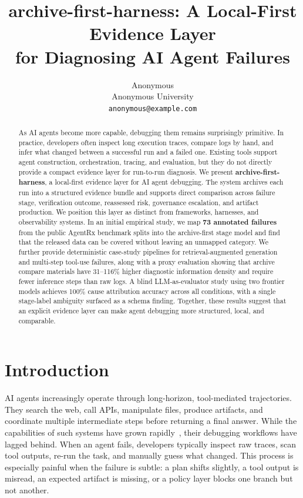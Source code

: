 \documentclass[11pt]{article}
\title{archive-first-harness: A Local-First Evidence Layer\\for Diagnosing AI Agent Failures}
\author{Anonymous \\ Anonymous University \\ \texttt{anonymous@example.com}}
\begin{document}
\maketitle

\begin{abstract}
As AI agents become more capable, debugging them remains surprisingly primitive. In practice, developers often inspect long execution traces, compare logs by hand, and infer what changed between a successful run and a failed one. Existing tools support agent construction, orchestration, tracing, and evaluation, but they do not directly provide a compact evidence layer for run-to-run diagnosis. We present \textbf{archive-first-harness}, a local-first evidence layer for AI agent debugging. The system archives each run into a structured evidence bundle and supports direct comparison across failure stage, verification outcome, reassessed risk, governance escalation, and artifact production. We position this layer as distinct from frameworks, harnesses, and observability systems. In an initial empirical study, we map \textbf{73 annotated failures} from the public AgentRx benchmark splits into the archive-first stage model and find that the released data can be covered without leaving an unmapped category. We further provide deterministic case-study pipelines for retrieval-augmented generation and multi-step tool-use failures, along with a proxy evaluation showing that archive compare materials have 31--116\% higher diagnostic information density and require fewer inference steps than raw logs. A blind LLM-as-evaluator study using two frontier models achieves 100\% cause attribution accuracy across all conditions, with a single stage-label ambiguity surfaced as a schema finding. Together, these results suggest that an explicit evidence layer can make agent debugging more structured, local, and comparable.
\end{abstract}

\section{Introduction}

AI agents increasingly operate through long-horizon, tool-mediated trajectories. They search the web, call APIs, manipulate files, produce artifacts, and coordinate multiple intermediate steps before returning a final answer. While the capabilities of such systems have grown rapidly~\cite{plaat2025agentic,guo2024llm}, their debugging workflows have lagged behind. When an agent fails, developers typically inspect raw traces, scan tool outputs, re-run the task, and manually guess what changed. This process is especially painful when the failure is subtle: a plan shifts slightly, a tool output is misread, an expected artifact is missing, or a policy layer blocks one branch but not another.
\end{document}
